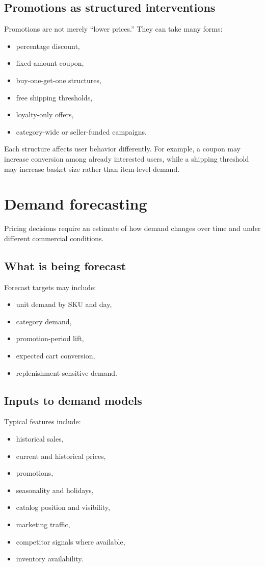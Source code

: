 \subsection{Promotions as structured interventions}
Promotions are not merely ``lower prices.''
They can take many forms:
\begin{itemize}
  \item percentage discount,
  \item fixed-amount coupon,
  \item buy-one-get-one structures,
  \item free shipping thresholds,
  \item loyalty-only offers,
  \item category-wide or seller-funded campaigns.
\end{itemize}

Each structure affects user behavior differently.
For example, a coupon may increase conversion among already interested users, while a shipping threshold may increase basket size rather than item-level demand.

\section{Demand forecasting}
Pricing decisions require an estimate of how demand changes over time and under different commercial conditions.

\subsection{What is being forecast}
Forecast targets may include:
\begin{itemize}
  \item unit demand by SKU and day,
  \item category demand,
  \item promotion-period lift,
  \item expected cart conversion,
  \item replenishment-sensitive demand.
\end{itemize}

\subsection{Inputs to demand models}
Typical features include:
\begin{itemize}
  \item historical sales,
  \item current and historical prices,
  \item promotions,
  \item seasonality and holidays,
  \item catalog position and visibility,
  \item marketing traffic,
  \item competitor signals where available,
  \item inventory availability.
\end{itemize}

